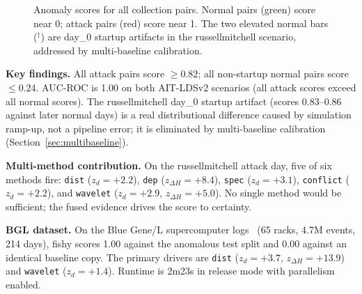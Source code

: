 \documentclass[10pt,twocolumn]{article}
\begin{document}
\begin{figure}[h]
\centering
{}
\caption{Anomaly scores for all collection pairs. Normal pairs (green) score near 0; attack pairs (red) score near 1. The two elevated normal bars ($^\dagger$) are day\_0 startup artifacts in the russellmitchell scenario, addressed by multi-baseline calibration.}
\label{fig:scores}
\end{figure}

\textbf{Key findings.}
All attack pairs score $\geq 0.82$; all non-startup normal pairs score $\leq 0.24$. AUC-ROC is 1.00 on both AIT-LDSv2 scenarios (all attack scores exceed all normal scores). The russellmitchell day\_0 startup artifact (scores 0.83--0.86 against later normal days) is a real distributional difference caused by simulation ramp-up, not a pipeline error; it is eliminated by multi-baseline calibration (Section~\ref{sec:multibaseline}).

\textbf{Multi-method contribution.} On the russellmitchell attack day, five of six methods fire: \texttt{dist} ($z_d{=}{+}2.2$), \texttt{dep} ($z_{\Delta H}{=}{+}8.4$), \texttt{spec} ($z_d{=}{+}3.1$), \texttt{conflict} ($z_d{=}{+}2.2$), and \texttt{wavelet} ($z_d{=}{+}2.9$, $z_{\Delta H}{=}{+}5.0$). No single method would be sufficient; the fused evidence drives the score to certainty.

\textbf{BGL dataset.} On the Blue Gene/L supercomputer logs~\cite{bgl} (65 racks, 4.7M events, 214 days), fishy scores 1.00 against the anomalous test split and 0.00 against an identical baseline copy. The primary drivers are \texttt{dist} ($z_d{=}{+}3.7$, $z_{\Delta H}{=}{+}13.9$) and \texttt{wavelet} ($z_d{=}{+}1.4$). Runtime is 2m23s in release mode with parallelism enabled.
\end{document}

